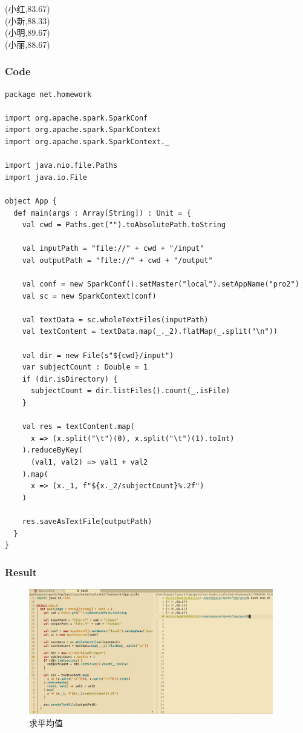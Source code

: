 \documentclass{article}
\begin{document}
    \noindent (小红,83.67) \\
    (小新,88.33) \\
    (小明,89.67) \\
    (小丽,88.67)

    \subsubsection{Code}

\begin{center}
\begin{verbatim}
package net.homework

import org.apache.spark.SparkConf
import org.apache.spark.SparkContext
import org.apache.spark.SparkContext._

import java.nio.file.Paths
import java.io.File

object App {
  def main(args : Array[String]) : Unit = {
    val cwd = Paths.get("").toAbsolutePath.toString

    val inputPath = "file://" + cwd + "/input"
    val outputPath = "file://" + cwd + "/output"

    val conf = new SparkConf().setMaster("local").setAppName("pro2")
    val sc = new SparkContext(conf)

    val textData = sc.wholeTextFiles(inputPath)
    val textContent = textData.map(_._2).flatMap(_.split("\n"))

    val dir = new File(s"${cwd}/input")
    var subjectCount : Double = 1
    if (dir.isDirectory) {
      subjectCount = dir.listFiles().count(_.isFile)
    }

    val res = textContent.map(
      x => (x.split("\t")(0), x.split("\t")(1).toInt)
    ).reduceByKey(
      (val1, val2) => val1 + val2
    ).map(
      x => (x._1, f"${x._2/subjectCount}%.2f")
    )

    res.saveAsTextFile(outputPath)
  }
}
\end{verbatim}
\end{center}

    \subsubsection{Result}

    \begin{figure}[H]
      \begin{center}
        \includegraphics[width=0.95\textwidth]{./figures/2.jpg}
      \end{center}
      \caption{求平均值}
    \end{figure}
\end{document}
